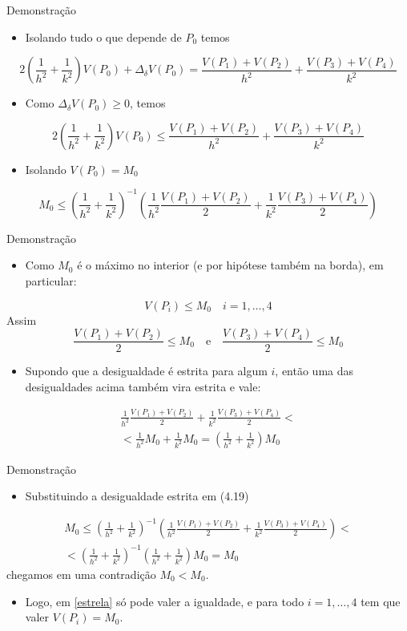 \documentclass{beamer}
\newcommand{\simpleitem}[1]{
    \begin{itemize}
        \item #1
    \end{itemize}}
\begin{document}
\begin{frame}{Demonstração}
    \simpleitem{Isolando tudo o que depende de $P_0$ temos}\small\pause
    \[
2\left(\frac{1}{h^2}+\frac{1}{k^2}\right)V(P_0) + \Delta_\delta V(P_0) = \frac{V(P_1)+V(P_2)}{h^2}+\frac{V(P_3)+V(P_4)}{k^2} 
\] \normalsize\pause
\simpleitem{Como $\Delta_\delta V(P_0) \ge 0$, temos}
\small
\[
2\left(\frac{1}{h^2}+\frac{1}{k^2}\right)V(P_0)  \le \frac{V(P_1)+V(P_2)}{h^2}+\frac{V(P_3)+V(P_4)}{k^2} 
\]\normalsize\pause
\simpleitem{Isolando $V(P_0) = M_0$}\footnotesize
\begin{equation}
M_0 \le  \left(\frac{1}{h^2}+\frac{1}{k^2}\right)^{-1}\left(\frac1{h^2}\frac{V(P_1)+V(P_2)}{2}+\frac1{k^2}\frac{V(P_3)+V(P_4)}{2} \right)
\tag{4.19}
\end{equation}
\end{frame}


 \begin{frame}{Demonstração}
 \simpleitem{Como $M_0$ é o máximo no interior (e por hipótese também na borda), em particular:}
 \begin{equation*}\tag{$\star$}\label{estrela}
     V(P_i) \le  M_0  \quad i=1,\ldots,4 
 \end{equation*} 
 Assim
 \small
 \[
 \frac{V(P_1)+V(P_2)}{2} \le M_0 \quad \text{e} \quad \frac{V(P_3)+V(P_4)}{2} \le M_0
 \]\pause
\normalsize
 \simpleitem{Supondo que a desigualdade é estrita para algum $i$, então uma das desigualdades acima também vira estrita e vale:}\small
\begin{multline*}
\frac1{h^2}\frac{V(P_1)+V(P_2)}{2}+\frac1{k^2}\frac{V(P_3)+V(P_4)}{2} < \\ < \frac1{h^2}M_0+\frac1{k^2}M_0 = \left(\frac1{h^2}+\frac1{k^2} \right)M_0
\end{multline*}
\end{frame}

\begin{frame}{Demonstração}
\simpleitem{Substituindo a desigualdade estrita em (4.19)}
\small
\begin{multline*}
M_0 \le  \left(\frac{1}{h^2}+\frac{1}{k^2}\right)^{-1}\left(\frac1{h^2}\frac{V(P_1)+V(P_2)}{2}+\frac1{k^2}\frac{V(P_3)+V(P_4)}{2} \right) <  \\ <
\left(\frac{1}{h^2}+\frac{1}{k^2}\right)^{-1}\left(\frac1{h^2}+\frac1{k^2} \right)M_0 = M_0
\end{multline*}\normalsize
chegamos em uma contradição $M_0 < M_0$.\pause
\simpleitem{Logo, em \eqref{estrela} só pode valer a igualdade, e para  todo $i=1,\ldots,4$ tem que valer $V(P_i) = M_0$. }
\end{frame}
\end{document}
